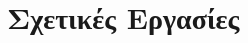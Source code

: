 \chapter{\label{method}Σχετικές Εργασίες}

\setcounter{equation}{0}
\setcounter{table}{0}
\setcounter{figure}{0}


    



